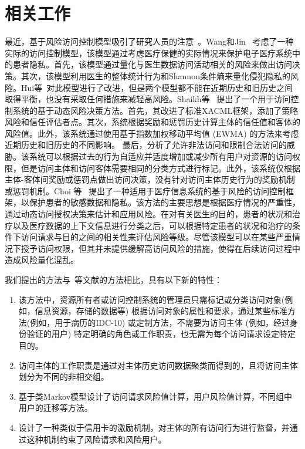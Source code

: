 \section{相关工作}
\label{sec:relate}
最近，基于风险访问控制模型吸引了研究人员的注意~\cite{wang2011quantified,shaikh2012dynamic,choi2015framework}。Wang和Jin~\cite{wang2011quantified} 考虑了一种实际的访问控制模型，该模型通过考虑医疗保健的实际情况来保护电子医疗系统中的患者隐私。首先，该模型通过量化与医生数据访问活动相关的风险来做出访问决策。其次，该模型利用医生的整体统计行为和Shannon条件熵来量化侵犯隐私的风险。Hui等~\cite{hui2015risk}对此模型进行了改进，但是两个模型都不能在近期历史和旧历史之间取得平衡，也没有采取任何措施来减轻高风险。Shaikh等~\cite{shaikh2012dynamic} 提出了一个用于访问控制系统的基于动态风险决策方法。首先，其改进了标准XACML框架，添加了策略风险和信任评估者点。其次，系统根据奖励和惩罚历史计算主体的信任值和客体的风险值。此外，该系统通过使用基于指数加权移动平均值 (EWMA) 的方法来考虑近期历史和旧历史的不同影响。 最后，分析了允许非法访问和限制合法访问的威胁。该系统可以根据过去的行为自适应并适度增加或减少所有用户对资源的访问权限，但是访问主体和访问客体需要相同的分类方式进行标记。此外，该系统仅根据主体-客体间奖励或惩罚点做出访问决策，没有针对访问主体历史行为的奖励机制或惩罚机制。Choi 等~\cite{choi2015framework}  提出了一种适用于医疗信息系统的基于风险的访问控制框架，以保护患者的敏感数据和隐私。该方法的主要思想是根据医疗情况的严重性，通过动态访问授权决策来估计和应用风险。在对有关医生的目的，患者的状况和治疗以及医疗数据的上下文信息进行分类之后，可以根据特定患者的状况和治疗的条件下访问请求与目的之间的相关性来评估风险等级。尽管该模型可以在某些严重情况下授予访问权限，但其并未提供缓解高访问风险的措施，使得在后续访问过程中造成风险量化混乱。

我们提出的方法与~\cite{wang2011quantified,shaikh2012dynamic,choi2015framework}等文献的方法相比，具有以下新的特性：

\begin{enumerate}
	\item 该方法中，资源所有者或访问控制系统的管理员只需标记或分类访问对象(例如，信息资源，存储的数据等) 根据访问对象的属性和要求，通过某些标准方法(例如，用于病历的IDC-10) 或定制方法，不需要为访问主体 (例如，经过身份验证的用户) 特定明确的角色或工作职责，也无需为每个访问请求设定特定目的。
	\item 访问主体的工作职责是通过对主体历史访问数据聚类而得到的，且将访问主体划分为不同的非相交组。
	\item 基于类Markov模型设计了访问请求风险值计算，用户风险值计算，不同组中用户的迁移等方法。
	\item 设计了一种类似于信用卡的激励机制，对主体的所有访问行为进行监督，并通过这种机制约束了风险请求和风险用户。
\end{enumerate}

